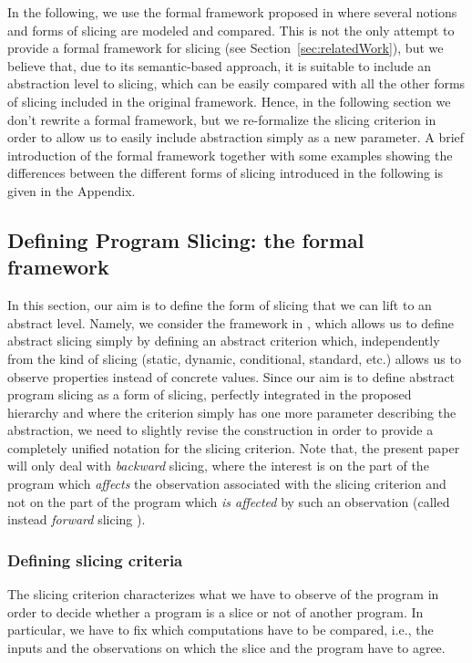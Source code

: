 \documentclass[prodmode,acmtocl]{acmsmall}
\newcommand{\0}{\mbox{\bf 0}}
\begin{document}
In the following, we use the formal framework proposed in \cite{AForm}
where several notions and forms of slicing are modeled and compared.
This is not the only attempt to provide a formal framework for slicing
(see Section~\ref{sec:relatedWork}), but we believe that, due to its
semantic-based approach, it is suitable to include an abstraction
level to slicing, which can be easily compared with all the other
forms of slicing included in the original framework. Hence, in the
following section we don't rewrite a formal framework, but we
re-formalize the slicing criterion in order to allow us to easily
include abstraction simply as a new parameter. A brief introduction of
the formal framework together with some examples showing the
differences between the different forms of slicing introduced in the
following is given in the Appendix.



\subsection{Defining Program Slicing: the formal framework}
\label{section:Background}
In this section, our aim is to define the form of slicing that we can
lift to an abstract level. Namely, we consider the framework in
\cite{AForm,TheoFoun}, which allows us to define abstract slicing
simply by defining an abstract criterion which, independently from the
kind of slicing (static, dynamic, conditional, standard, etc.) allows
us to observe properties instead of concrete values. Since our aim is
to define abstract program slicing as a form of slicing, perfectly
integrated in the proposed hierarchy and where the criterion simply
has one more parameter describing the abstraction, we need to slightly
revise the construction in order to provide a completely unified
notation for the slicing criterion.
Note that, the present paper will only deal with \emph{backward}
slicing, where the interest is on the part of the program which
\emph{affects} the observation associated with the slicing criterion
and not on the part of the program which \emph{is affected} by such an
observation (called instead \emph{forward} slicing \cite{Tip95}).

\subsubsection*{Defining slicing criteria}

The slicing criterion characterizes what we have to observe of the
program in order to decide whether a program is a slice or not of
another program.  In particular, we have to fix which computations
have to be compared, i.e., the inputs and the observations on which
the slice and the program have to agree.
\end{document}
